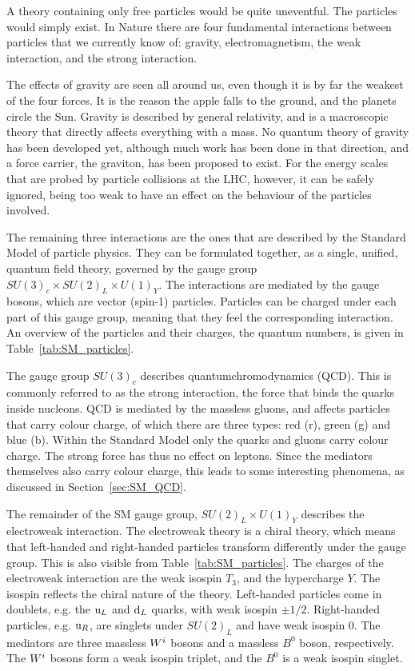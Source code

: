 A theory containing only free particles would be quite uneventful. The particles would simply
exist.
In Nature there are four fundamental interactions between particles that we currently know of:
gravity, electromagnetism, the weak interaction, and the strong interaction. 

The effects of gravity are seen all around us, even though it is by far the weakest of the four
forces. It is the reason the apple falls to the ground, and the planets circle the Sun. 
Gravity is described by general relativity, and is a macroscopic theory that directly affects
everything with a mass. No quantum theory of gravity has been developed yet, although much work has
been done in that direction, and a force carrier, the graviton, has been proposed to exist. For the
energy scales that are probed by particle collisions at the LHC, however, it can be safely ignored,
being too weak to have an effect on the behaviour of the particles involved. 

The remaining three interactions are the ones that are described by the Standard Model of
particle physics. They can be formulated together, as a single, unified, quantum field theory,
governed by the gauge group $SU(3)_c \times SU(2)_L \times U(1)_Y$. The interactions are mediated by
the gauge bosons, which are vector (spin-1) particles. Particles can be charged under each part of
this gauge group, meaning that they feel the corresponding interaction. An overview of the
particles and their charges, the quantum numbers, is given in Table~\ref{tab:SM_particles}. 

The gauge group $SU(3)_c$ describes quantumchromodynamics (QCD). This is commonly referred to as the
strong interaction, the force that binds the quarks inside nucleons. QCD is mediated by the
massless gluons, and affects particles that carry colour charge, of which there are three types:
red (r), green (g) and blue (b). Within the Standard Model only the quarks and gluons carry colour
charge. The strong force has thus no effect on leptons. 
Since the mediators themselves also carry colour charge, this leads to some interesting phenomena,
as discussed in Section~\ref{sec:SM_QCD}. 

The remainder of the SM gauge group, $SU(2)_L \times U(1)_Y$ describes the electroweak interaction. 
The electroweak theory is a chiral theory, which means that left-handed and right-handed particles
transform differently under the gauge group. This is also visible from
Table~\ref{tab:SM_particles}.
The charges of the electroweak interaction are the weak isospin $T_3$, and the hypercharge $Y$. 
The isospin reflects the chiral nature of the theory. Left-handed particles come in doublets, e.g.
the $\mathrm{u}_L$ and $\mathrm{d}_L$ quarks, with weak isospin $\pm 1/2$. Right-handed particles, e.g.
$\mathrm{u}_R$, are singlets under $SU(2)_L$ and have weak isospin 0. 
The mediators are three massless $W^i$ bosons and a massless $B^0$ boson, respectively. The $W^i$
bosons form a weak isospin triplet, and the $B^0$ is a weak isospin singlet. 


